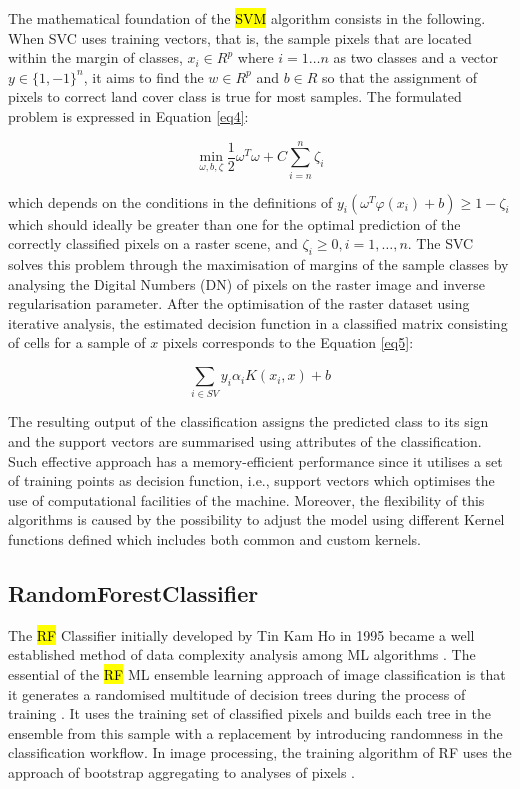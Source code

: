 \documentclass[final,5p,times,twocolumn]{elsarticle}
\numberwithin{table}{section}
\begin{document}
The mathematical foundation of the \hl{SVM} algorithm consists in the following. When SVC uses training vectors, that is, the sample pixels that are located within the margin of classes,
$x_{i} \in R^p$ where $ i=1 \dots n$ as two classes and a vector $y \in \{1, - 1\}^n$, it aims to find the $w \in R^p$ and $b \in R$ so that the assignment of pixels to correct land cover class is true for most samples. The formulated problem is expressed in Equation \ref{eq4}:

\begin{equation}
\min_{\omega,b,\zeta}\frac{1}{2}\omega^T\omega+C\sum_{i=n}^{n}\zeta_{i}
\label{eq4}
\end{equation}

which depends on the conditions in the definitions of $y_{i}(\omega^{T}\varphi (x_i) + b)\geq 1-\zeta_{i}$ which should ideally be greater than one for the optimal prediction of the correctly classified pixels on a raster scene, and $\zeta_{i}\geq 0, i = 1,\dots,n$. The SVC solves this problem through the maximisation of margins of the sample classes by analysing the Digital Numbers (DN) of pixels on the raster image and inverse regularisation parameter. After the optimisation of the raster dataset using iterative analysis, the estimated decision function in a classified matrix consisting of cells for a sample of $x$ pixels corresponds to the Equation \ref{eq5}:

\begin{equation}
\sum_{i\in SV}y_{i}\alpha_{i}K(x_{i},x) + b
\label{eq5}
\end{equation}

The resulting output of the classification assigns the predicted class to its sign and the support vectors are summarised using attributes of the classification. Such effective approach has a memory-efficient performance since it utilises a set of training points as decision function, i.e., support vectors which optimises the use of computational facilities of the machine. Moreover, the flexibility of this algorithms is caused by the possibility to adjust the model using different Kernel functions defined which includes both common and custom kernels. 
 
\subsection{RandomForestClassifier}

The \hl{RF} Classifier initially developed by Tin Kam Ho in 1995 \cite{598994} became a well established method of data complexity analysis among ML algorithms \cite{990132}. The essential of the \hl{RF} ML ensemble learning approach of image classification is that it generates a randomised multitude of decision trees during the process of training \cite{8935521}. It uses the training set of classified pixels and builds each tree in the ensemble from this sample with a replacement by introducing randomness in the classification workflow. In image processing, the training algorithm of RF uses the approach of bootstrap aggregating to analyses of pixels \cite{Bai,coasts4010008,BESSINGER2022928}. 
\end{document}
